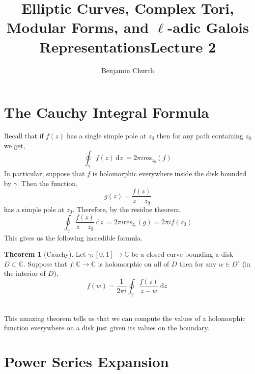 \documentclass{article}
\title{Elliptic Curves, Complex Tori, Modular Forms, and $\ell$-adic Galois Representations}
\author{Benjamin Church}
\newcommand{\C}{\mathbb{C}}
\renewcommand{\d}[1]{\: \mathrm{d}#1 \:}
\theoremstyle{definition}
\newtheorem{theorem}{Theorem}[section]
\newcommand{\res}{\mathrm{res}}
\begin{document}
\title{Lecture 2}

\maketitle

\section{The Cauchy Integral Formula}

Recall that if $f(z)$ has a single simple pole at $z_0$ then for any path containing $z_0$ we get,
\[ \oint_{\gamma} f(z) \d{z} = 2 \pi i \res_{z_0}(f) \]
In particular, suppose that $f$ is holomorphic everywhere inside the disk bounded by $\gamma$. Then the function,
\[ g(z) = \frac{f(z)}{z - z_0} \]
has a simple pole at $z_0$. Therefore, by the residue theorem,
\[ \oint_{\gamma} \frac{f(z)}{z - z_0} \d{z} = 2 \pi i \res_{z_0}(g) = 2 \pi i f(z_0) \]
This gives us the following incredible formula.

\begin{theorem}[Cauchy]
Let $\gamma : [0,1] \to \C$ be a closed curve bounding a disk $D \subset \C$. Suppose that $f : \C \to \C$ is holomorphic on all of $D$ then for any $w \in D^\circ$ (in the interior of $D$),
\[  f(w) = \frac{1}{2 \pi i} \oint_{\gamma} \frac{f(z)}{z - w} \d{z} \]
\end{theorem}

\noindent\\
This amazing theorem tells us that we can compute the values of a holomorphic function everywhere on a disk just given its values on the boundary.

\section{Power Series Expansion}
\end{document}
